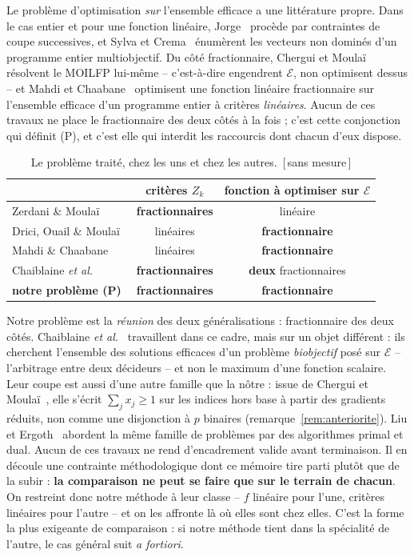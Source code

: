 \documentclass[11pt,a4paper]{article}
\theoremstyle{plain}
\theoremstyle{remark}
\newcommand{\Zk}{Z_k}
\newcommand{\Ecal}{\mathcal{E}}
\newcommand{\confna}{\textsf{\footnotesize[\,sans mesure\,]}}
\begin{document}
Le problème d'optimisation \emph{sur} l'ensemble efficace a une littérature
propre. Dans le cas entier et pour une fonction linéaire,
Jorge~\cite{jorge2009} procède par contraintes de coupe successives, et
Sylva et Crema~\cite{sylva2004} énumèrent les vecteurs non dominés d'un
programme entier multiobjectif. Du côté fractionnaire, Chergui et
Moulaï~\cite{chergui2008} résolvent le MOILFP lui-même -- c'est-à-dire
engendrent $\Ecal$, non optimisent dessus -- et Mahdi et
Chaabane~\cite{mahdi2015} optimisent une fonction linéaire fractionnaire
sur l'ensemble efficace d'un programme entier à critères \emph{linéaires}.
Aucun de ces travaux ne place le fractionnaire des deux côtés à la fois ;
c'est cette conjonction qui définit (P), et c'est elle qui interdit les
raccourcis dont chacun d'eux dispose.

\begin{table}[H]
\centering
\caption{Le problème traité, chez les uns et chez les autres.\ \confna}
\label{tab:positionnement}
\begin{tabular}{lcc}
\toprule
& critères $\Zk$ & fonction à optimiser sur $\Ecal$\\
\midrule
Zerdani \& Moulaï~\cite{zerdani2011} & \textbf{fractionnaires} & linéaire\\
Drici, Ouail \& Moulaï~\cite{drici2018} & linéaires & \textbf{fractionnaire}\\
Mahdi \& Chaabane~\cite{mahdi2015} & linéaires & \textbf{fractionnaire}\\
Chaiblaine \emph{et al.}~\cite{chaiblaine2020}
 & \textbf{fractionnaires} & \textbf{deux} fractionnaires\\
\midrule
\textbf{notre problème (P)} & \textbf{fractionnaires} & \textbf{fractionnaire}\\
\bottomrule
\end{tabular}
\end{table}

\noindent
Notre problème est la \emph{réunion} des deux généralisations :
fractionnaire des deux côtés. Chaiblaine \emph{et
al.}~\cite{chaiblaine2020} travaillent dans ce cadre, mais sur un objet
différent : ils cherchent l'ensemble des solutions efficaces d'un problème
\emph{biobjectif} posé sur $\Ecal$ -- l'arbitrage entre deux décideurs --
et non le maximum d'une fonction scalaire. Leur coupe est aussi d'une autre
famille que la nôtre : issue de Chergui et Moulaï~\cite{chergui2008}, elle
s'écrit $\sum_j x_j\ge 1$ sur les indices hors base à partir des gradients
réduits, non comme une disjonction à $p$ binaires
(remarque~\ref{rem:anteriorite}). Liu et Ergoth~\cite{liu2018} abordent la
même famille de problèmes par des algorithmes primal et dual. Aucun de ces
travaux ne rend d'encadrement valide avant terminaison. Il en découle une
contrainte méthodologique dont ce mémoire tire parti plutôt que de la
subir : \textbf{la comparaison ne peut se faire que sur le terrain de
chacun}. On restreint donc notre méthode à leur classe -- $f$ linéaire pour
l'une, critères linéaires pour l'autre -- et on les affronte là où elles
sont chez elles. C'est la forme la plus exigeante de comparaison : si notre
méthode tient dans la spécialité de l'autre, le cas général suit
\emph{a fortiori}.
\end{document}
